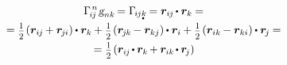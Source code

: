 \begin{otherlanguage}{russian}
\begin{multline}
\Gamma_{\hspace{-0.25ex}i\hspace{-0.1ex}j}^{\hspace{.25ex}n} \hspace{.16ex} \textsl{g}_{nk} \hspace{-0.24ex} = \Gamma_{\hspace{-0.25ex}i\hspace{-0.1ex}j\mathdotbelow{k}} \hspace{-0.2ex} = \bm{r}_{i\hspace{-0.1ex}j} \hspace{-0.2ex} \dotp \bm{r}_k \hspace{-0.1ex} = \\[-0.1em]
%
= \smalldisplaystyleonehalf \hspace{-0.2ex} \left( \bm{r}_{i\hspace{-0.1ex}j} \hspace{-0.16ex} + \bm{r}_{\hspace{-0.2ex}j\hspace{-0.06ex}i} \right) \hspace{-0.1ex} \dotp \bm{r}_k \hspace{-0.1ex}
+ \smalldisplaystyleonehalf \hspace{-0.2ex} \left( \bm{r}_{\hspace{-0.2ex}j\hspace{-0.1ex}k} \hspace{-0.16ex} - \bm{r}_{kj} \right) \hspace{-0.1ex} \dotp \bm{r}_i \hspace{-0.1ex}
+ \smalldisplaystyleonehalf \hspace{-0.2ex} \left( \bm{r}_{ik} \hspace{-0.16ex} - \bm{r}_{ki} \right) \hspace{-0.1ex} \dotp \bm{r}_{\hspace{-0.2ex}j} \hspace{-0.1ex} = \\[-0.12em]
%
= \smalldisplaystyleonehalf \hspace{-0.2ex} \left( \scalebox{0.96}[1]{$\bm{r}_{i\hspace{-0.1ex}j} \hspace{-0.2ex} \dotp \bm{r}_k \hspace{-0.16ex} + \bm{r}_{ik} \hspace{-0.2ex} \dotp \bm{r}_{\hspace{-0.2ex}j}$} \right) \hspace{-0.16ex}

\end{multline}
\end{otherlanguage}
